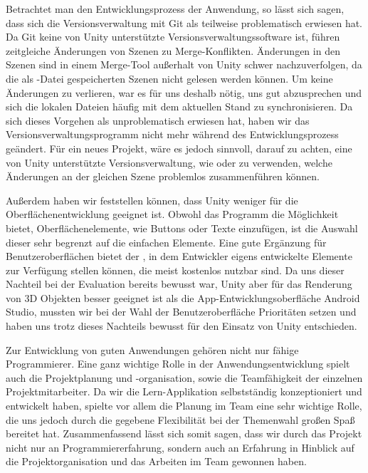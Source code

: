 Betrachtet man den Entwicklungsprozess der Anwendung, so lässt sich sagen, dass sich die Versionsverwaltung mit Git als teilweise problematisch erwiesen hat.
Da Git keine von Unity unterstützte Versionsverwaltungssoftware ist, führen zeitgleiche Änderungen von Szenen zu Merge-Konflikten.
Änderungen in den Szenen sind in einem Merge-Tool außerhalt von Unity schwer nachzuverfolgen, da die als -Datei gespeicherten Szenen nicht gelesen werden können. 
Um keine Änderungen zu verlieren, war es für uns deshalb nötig, uns gut abzusprechen und sich die lokalen Dateien häufig mit dem aktuellen Stand zu synchronisieren.
Da sich dieses Vorgehen als unproblematisch erwiesen hat, haben wir das Versionsverwaltungsprogramm nicht mehr während des Entwicklungsprozess geändert.
Für ein neues Projekt, wäre es jedoch sinnvoll, darauf zu achten, eine von Unity unterstützte Versionsverwaltung, wie  oder  zu verwenden, welche Änderungen an der gleichen Szene problemlos zusammenführen können.

Außerdem haben wir feststellen können, dass Unity weniger für die Oberflächenentwicklung geeignet ist. 
Obwohl das Programm die Möglichkeit bietet, Oberflächenelemente, wie Buttons oder Texte einzufügen, ist die Auswahl dieser sehr begrenzt auf die einfachen Elemente.
Eine gute Ergänzung für Benutzeroberflächen bietet der , in dem Entwickler eigens entwickelte Elemente zur Verfügung stellen können, die meist kostenlos nutzbar sind.
Da uns dieser Nachteil bei der Evaluation bereits bewusst war, Unity aber für das Renderung von 3D Objekten besser geeignet ist als die App-Entwicklungsoberfläche Android Studio, mussten wir bei der Wahl der Benutzeroberfläche Prioritäten setzen und haben uns trotz dieses Nachteils bewusst für den Einsatz von Unity entschieden.

Zur Entwicklung von guten Anwendungen gehören nicht nur fähige Programmierer.
Eine ganz wichtige Rolle in der Anwendungsentwicklung spielt auch die Projektplanung und -organisation, sowie die Teamfähigkeit der einzelnen Projektmitarbeiter.
Da wir die Lern-Applikation selbstständig konzeptioniert und entwickelt haben, spielte vor allem die Planung im Team eine sehr wichtige Rolle, die uns jedoch durch die gegebene Flexibilität bei der Themenwahl großen Spaß bereitet hat.
Zusammenfassend lässt sich somit sagen, dass wir durch das Projekt nicht nur an Programmiererfahrung, sondern auch an Erfahrung in Hinblick auf die Projektorganisation und das Arbeiten im Team gewonnen haben. 